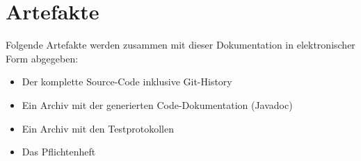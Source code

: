 \section{Artefakte}
\label{sec:einleitung.Artefakte}

Folgende Artefakte werden zusammen mit dieser Dokumentation in elektronischer Form abgegeben:
\begin{itemize}
\item Der komplette Source-Code inklusive Git-History
\item Ein Archiv mit der generierten Code-Dokumentation (Javadoc)
\item Ein Archiv mit den Testprotokollen
\item Das Pflichtenheft
\end{itemize}
